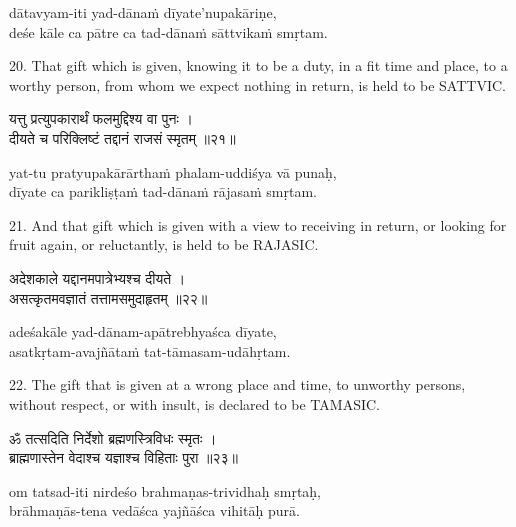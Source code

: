 \begin{transliteration}
dātavyam-iti yad-dānaṁ dīyate'nupakāriṇe, \\
deśe kāle ca pātre ca tad-dānaṁ sāttvikaṁ smṛtam.
\end{transliteration}

20. That gift which is given, knowing it to be a duty, in a fit time and place,
to a worthy person, from whom we expect nothing in return, is held to be
SATTVIC.\@

\begin{gitaverse}
यत्तु प्रत्युपकारार्थं फलमुद्दिश्य वा पुनः । \\
दीयते च परिक्लिष्टं तद्दानं राजसं स्मृतम् ॥२१॥
\end{gitaverse}

\begin{transliteration}
yat-tu pratyupakārārthaṁ phalam-uddiśya vā punaḥ, \\
dīyate ca parikliṣṭaṁ tad-dānaṁ rājasaṁ smṛtam.
\end{transliteration}

21. And that gift which is given with a view to receiving in return, or looking
for fruit again, or reluctantly, is held to be RAJASIC.\@

\begin{gitaverse}
अदेशकाले यद्दानमपात्रेभ्यश्च दीयते । \\
असत्कृतमवज्ञातं तत्तामसमुदाहृतम् ॥२२॥
\end{gitaverse}

\begin{transliteration}
adeśakāle yad-dānam-apātrebhyaśca dīyate, \\
asatkṛtam-avajñātaṁ tat-tāmasam-udāhṛtam.
\end{transliteration}

22. The gift that is given at a wrong place and time, to unworthy persons,
without respect, or with insult, is declared to be TAMASIC.\@

\begin{gitaverse}
ॐ तत्सदिति निर्देशो ब्रह्मणस्त्रिविधः स्मृतः । \\
ब्राह्मणास्तेन वेदाश्च यज्ञाश्च विहिताः पुरा ॥२३॥
\end{gitaverse}

\begin{transliteration}
om tatsad-iti nirdeśo brahmaṇas-trividhaḥ smṛtaḥ, \\
brāhmaṇās-tena vedāśca yajñāśca vihitāḥ purā.
\end{transliteration}

